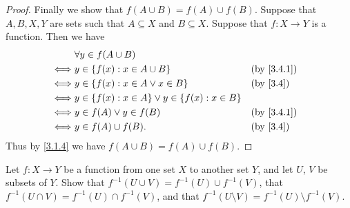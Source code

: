 \begin{proof}
	Finally we show that \(f(A \cup B) = f(A) \cup f(B)\).
	Suppose that \(A, B, X, Y\) are sets such that \(A \subseteq X\) and \(B \subseteq X\).
	Suppose that \(f : X \to Y\) is a function.
	Then we have
	\begin{align*}
		     & \forall y \in f(A \cup B)                                                  \\
		\iff & y \in \set{f(x) : x \in A \cup B}                          &  & \by{3.4.1} \\
		\iff & y \in \set{f(x) : x \in A \lor x \in B}                    &  & \by{3.4}   \\
		\iff & y \in \set{f(x) : x \in A} \lor y \in \set{f(x) : x \in B}                 \\
		\iff & y \in f(A) \lor y \in f(B)                                 &  & \by{3.4.1} \\
		\iff & y \in f(A) \cup f(B).                                      &  & \by{3.4}
	\end{align*}
	Thus by \cref{3.1.4} we have \(f(A \cup B) = f(A) \cup f(B)\).
\end{proof}

\begin{ex}\label{ex:3.4.4}
	Let \(f : X \to Y\) be a function from one set \(X\) to another set \(Y\), and let \(U\), \(V\) be subsets of \(Y\). Show that \(f^{-1}(U \cup V) = f^{-1}(U) \cup f^{-1}(V)\), that
	\(f^{-1}(U \cap V) = f^{-1}(U) \cap f^{-1}(V)\), and that \(f^{-1}(U \setminus V) = f^{-1}(U) \setminus f^{-1}(V)\).
\end{ex}

